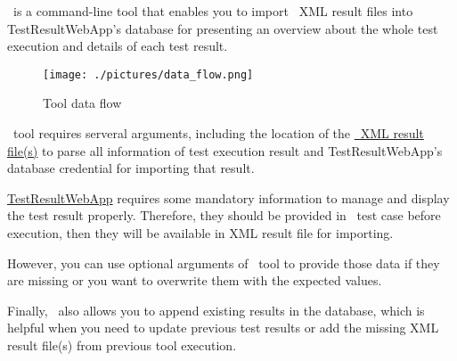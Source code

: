 



\pkg\ is a command-line tool that enables you to import \rfwcore\ XML result
files into TestResultWebApp's database for presenting an overview about the
whole test execution and details of each test result.

\begin{figure}[h!]
   \texttt{[image: ./pictures/data\_flow.png]}
   \caption{Tool data flow}
\end{figure}

\pkg\ tool requires serveral arguments, including the location of the
\href{https://robotframework.org/robotframework/latest/RobotFrameworkUserGuide.html#output-file}
{\rfwcore\ XML result file(s)} to parse all information of test execution result
and TestResultWebApp's database credential for importing that result.

\href{https://github.com/test-fullautomation/testresultwebapp}{TestResultWebApp}
requires some mandatory information to manage and display the test result properly.
Therefore, they should be provided in \rfwcore\ test case before execution, then
they will be available in XML result file for importing.

However, you can use optional arguments of \pkg\ tool to provide those data
if they are missing or you want to overwrite them with the expected values.

Finally, \pkg\ also allows you to append existing results in the database, which
is helpful when you need to update previous test results or add the missing
XML result file(s) from previous tool execution.
